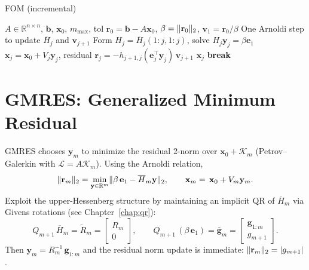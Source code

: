 \begin{algorithm}[H]
  \caption{FOM (incremental)}\label{alg:fom}
  \begin{algorithmic}[0]
    \Require $A\in\mathbb{R}^{n\times n}$, $\mathbf{b}$, $\mathbf{x}_0$, $m_{\max}$, tol
    \State $\mathbf{r}_0=\mathbf{b}-A\mathbf{x}_0$, $\beta=\lVert\mathbf{r}_0\rVert_2$, $\mathbf{v}_1=\mathbf{r}_0/\beta$
    \State One Arnoldi step to update $\overline H_j$ and $\mathbf{v}_{j+1}$
    \State Form $H_j=\overline H_j(1{:}j,1{:}j)$, solve $H_j\mathbf{y}_j=\beta\mathbf{e}_1$
    \State $\mathbf{x}_j=\mathbf{x}_0+V_j\mathbf{y}_j$, residual $\mathbf{r}_j = -h_{j+1,j}(\mathbf{e}_j^{\top}\mathbf{y}_j)\,\mathbf{v}_{j+1}$
     \Return $\mathbf{x}_j$ \EndIf
     \State \textbf{break}  \EndIf
    \EndFor
  \end{algorithmic}
\end{algorithm}

\section{GMRES: Generalized Minimum Residual}
GMRES chooses $\mathbf{y}_m$ to minimize the residual 2-norm over $\mathbf{x}_0+\mathcal{K}_m$ (Petrov--Galerkin with $\mathcal{L}=A\mathcal{K}_m$). Using the Arnoldi relation,
\[
  \lVert\mathbf{r}_m\rVert_2 = \min_{\mathbf{y}\in\mathbb{R}^m} \lVert\beta\,\mathbf{e}_1 - \overline H_m\mathbf{y}\rVert_2,\qquad \mathbf{x}_m=\mathbf{\,x}_0+V_m\mathbf{y}_m.
\]
Exploit the upper-Hessenberg structure by maintaining an implicit QR of $\overline H_m$ via Givens rotations (see Chapter~\ref{chap:qr}):
\[
  Q_{m+1}\,\overline H_m = \tilde{R}_m = \begin{bmatrix} R_m \\ 0 \end{bmatrix},\qquad Q_{m+1}\,(\beta\,\mathbf{e}_1)=\bar{\mathbf{g}}_m=\begin{bmatrix}\mathbf{g}_{1:m}\\g_{m+1}\end{bmatrix}.
\]
Then $\mathbf{y}_m = R_m^{-1}\,\mathbf{g}_{1:m}$ and the residual norm update is immediate: $\lVert\mathbf{r}_m\rVert_2 = |g_{m+1}|$.

